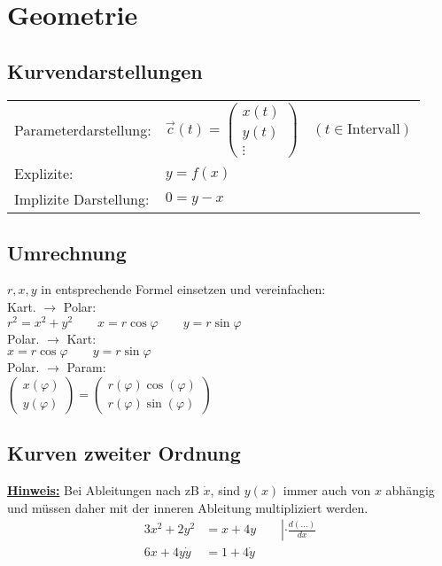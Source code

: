 \section{Geometrie}
\subsection{Kurvendarstellungen }
\begin{tabular}{ l l }
	Parameterdarstellung: & $\vec{c}(t) = \begin{pmatrix}
		x(t) \\
		y(t) \\
		\vdots
	\end{pmatrix} \quad (t \in \text{Intervall})$\\
	Explizite: & $y = f(x)$\\
	Implizite Darstellung: & $0 = y - x$    
\end{tabular}

\subsection{Umrechnung}
$r, x, y$ in entsprechende Formel einsetzen und vereinfachen:\\

\noindent Kart. $\rightarrow$ Polar: \\
$r^2 = x^2 + y^2 \qquad x = r\cos\varphi \qquad y = r\sin\varphi$\\

\noindent Polar. $\rightarrow$ Kart: \\
$x = r\cos\varphi \qquad y = r\sin\varphi$\\


\noindent Polar. $\rightarrow$ Param: \\
$\begin{pmatrix}
	x(\varphi) \\ y(\varphi)
\end{pmatrix} 
=
\begin{pmatrix}
	r(\varphi)\cos(\varphi) \\ r(\varphi)\sin(\varphi)
\end{pmatrix}$\\

\subsection{Kurven zweiter Ordnung }
\textbf{\href{https://www.youtube.com/watch?v=ZOOu9HqDFx0}{Hinweis:}} Bei Ableitungen nach zB $\dot{x}$, sind $y(x)$ immer auch von $x$ abhängig und müssen daher mit der inneren Ableitung multipliziert werden. 
\begin{align*}
	3x^2 + 2y^2 &= x + 4y \qquad \left| \cdot \frac{d(...)}{dx}\right. \\
	6x + 4y\dot{y} &= 1 + 4\dot{y}
\end{align*}

